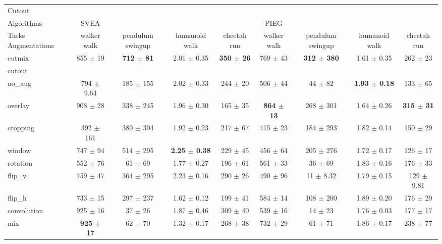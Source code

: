 \begin{tabular}{lcccccccc}
Cutout & & & & & & & & \\
Algorithms & SVEA & & & & PIEG & & & \\
Tasks Augmentations & walker walk & pendulum swingup & humanoid walk & cheetah run & walker walk & pendulum swingup & humanoid walk & cheetah run \\
cutmix          & 855 $\pm$ 19 & \textbf{712 $\pm$ 81} & 2.01 $\pm$ 0.35 & \textbf{350 $\pm$ 26} & 769 $\pm$ 43 & \textbf{312 $\pm$ 380} & 1.61 $\pm$ 0.35 & 262 $\pm$ 23 \\
cutout          &  &  &  &  &  &  &  &  \\
no\_aug         & 794 $\pm$ 9.64 & 185 $\pm$ 155 & 2.02 $\pm$ 0.33 & 244 $\pm$ 20 & 506 $\pm$ 44 & 44 $\pm$ 82 & \textbf{1.93 $\pm$ 0.18} & 133 $\pm$ 65 \\
overlay         & 908 $\pm$ 28 & 338 $\pm$ 245 & 1.96 $\pm$ 0.30 & 165 $\pm$ 35 & \textbf{864 $\pm$ 13} & 268 $\pm$ 301 & 1.64 $\pm$ 0.26 & \textbf{315 $\pm$ 31} \\
cropping        & 392 $\pm$ 161 & 380 $\pm$ 304 & 1.92 $\pm$ 0.23 & 217 $\pm$ 67 & 415 $\pm$ 23 & 184 $\pm$ 293 & 1.82 $\pm$ 0.14 & 150 $\pm$ 29 \\
window          & 747 $\pm$ 94 & 514 $\pm$ 295 & \textbf{2.25 $\pm$ 0.38} & 229 $\pm$ 45 & 456 $\pm$ 64 & 205 $\pm$ 276 & 1.72 $\pm$ 0.17 & 126 $\pm$ 17 \\
rotation        & 552 $\pm$ 76 & 61 $\pm$ 69 & 1.77 $\pm$ 0.27 & 196 $\pm$ 61 & 561 $\pm$ 33 & 36 $\pm$ 69 & 1.83 $\pm$ 0.16 & 176 $\pm$ 33 \\
flip\_v         & 759 $\pm$ 47 & 364 $\pm$ 295 & 2.23 $\pm$ 0.16 & 290 $\pm$ 26 & 490 $\pm$ 96 & 11 $\pm$ 8.32 & 1.79 $\pm$ 0.15 & 129 $\pm$ 9.81 \\
flip\_h         & 733 $\pm$ 15 & 297 $\pm$ 237 & 1.62 $\pm$ 0.12 & 199 $\pm$ 41 & 584 $\pm$ 14 & 108 $\pm$ 200 & 1.89 $\pm$ 0.20 & 176 $\pm$ 29 \\
convolution     & 925 $\pm$ 16 & 37 $\pm$ 26 & 1.87 $\pm$ 0.46 & 309 $\pm$ 40 & 539 $\pm$ 16 & 14 $\pm$ 23 & 1.76 $\pm$ 0.03 & 177 $\pm$ 17 \\
mix             & \textbf{925 $\pm$ 17} & 62 $\pm$ 70 & 1.32 $\pm$ 0.17 & 268 $\pm$ 38 & 732 $\pm$ 29 & 61 $\pm$ 71 & 1.86 $\pm$ 0.17 & 238 $\pm$ 77 \\
\end{tabular}